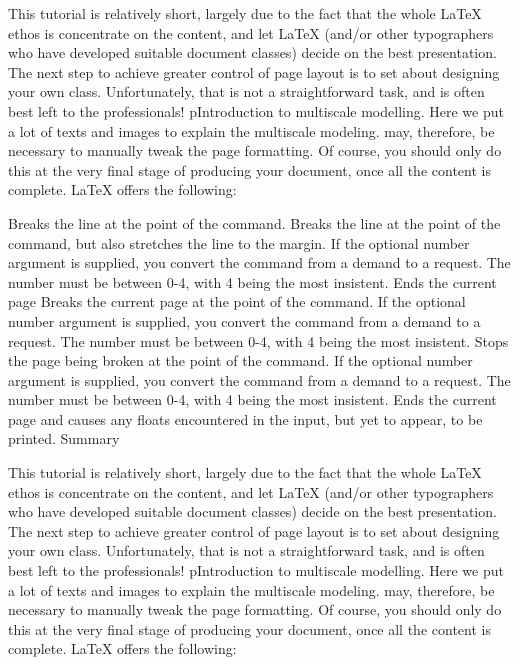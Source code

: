 \documentclass[a0paper]{article}
\begin{document}
\vspace{5cm}
\setlength{\columnsep}{6cm}
\begin{multicols}{3}

\Huge

This tutorial is relatively short, largely due to the fact that the whole LaTeX
ethos is concentrate on the content, and let LaTeX (and/or other typographers
who have developed suitable document classes) decide on the best presentation.
The next step to achieve greater control of page layout is to set about
designing your own class. Unfortunately, that is not a straightforward task, and
is often best left to the professionals! 
pIntroduction to multiscale modelling. Here we put a lot of texts and images to
explain the multiscale modeling.  may, therefore, be necessary to manually tweak
the page formatting. Of course, you should only do this at the very final stage
of producing your document, once all the content is complete. LaTeX offers the
following:


Breaks the line at the point of the command.  Breaks the line at the point of
the command, but also stretches the line to the margin. If the optional number
argument is supplied, you convert the command from a demand to a request. The
number must be between 0-4, with 4 being the most insistent.  Ends the current
page Breaks the current page at the point of the command. If the optional number
argument is supplied, you convert the command from a demand to a request. The
number must be between 0-4, with 4 being the most insistent.  Stops the page
being broken at the point of the command. If the optional number argument is
supplied, you convert the command from a demand to a request. The number must be
between 0-4, with 4 being the most insistent.  Ends the current page and causes
any floats encountered in the input, but yet to appear, to be printed.  Summary

This tutorial is relatively short, largely due to the fact that the whole LaTeX
ethos is concentrate on the content, and let LaTeX (and/or other typographers
who have developed suitable document classes) decide on the best presentation.
The next step to achieve greater control of page layout is to set about
designing your own class. Unfortunately, that is not a straightforward task, and
is often best left to the professionals! 
pIntroduction to multiscale modelling. Here we put a lot of texts and images to
explain the multiscale modeling.  may, therefore, be necessary to manually tweak
the page formatting. Of course, you should only do this at the very final stage
of producing your document, once all the content is complete. LaTeX offers the
following:



\end{multicols}
\end{document}
